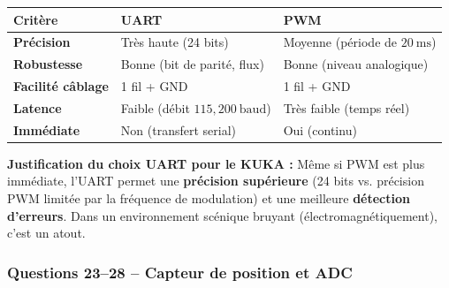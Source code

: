 \documentclass[12pt,a4paper,twoside]{article}
\begin{document}
\begin{correction}
  \begin{center}
    \begin{tabular}{|p{2cm}|p{3.5cm}|p{3.5cm}|}
      \hline
      \textbf{Critère} & \textbf{UART} & \textbf{PWM} \\
      \hline
      \textbf{Précision} & Très haute (24 bits) & Moyenne (période de $20~\text{ms}$) \\
      \hline
      \textbf{Robustesse} & Bonne (bit de parité, flux) & Bonne (niveau analogique) \\
      \hline
      \textbf{Facilité câblage} & 1 fil + GND & 1 fil + GND \\
      \hline
      \textbf{Latence} & Faible (débit $115{,}200~\text{baud}$) & Très faible (temps réel) \\
      \hline
      \textbf{Immédiate} & Non (transfert serial) & Oui (continu) \\
      \hline
    \end{tabular}
  \end{center}

  \textbf{Justification du choix UART pour le KUKA :} Même si PWM est plus immédiate, l'UART permet une \textbf{précision supérieure} (24 bits vs. précision PWM limitée par la fréquence de modulation) et une meilleure \textbf{détection d'erreurs}. Dans un environnement scénique bruyant (électromagnétiquement), c'est un atout.
\end{correction}

\subsubsection{Questions 23--28 -- Capteur de position et ADC}
\end{document}
